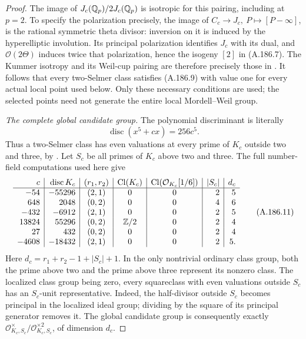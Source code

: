 \begin{proof}
The image of \(J_c(\mathbb Q_p)/2J_c(\mathbb Q_p)\) is isotropic
for this pairing, including at \(p=2\).  To specify the
polarization precisely, the image of
\(C_c\to J_c,\ P\mapsto[P-\infty]\), is the rational
symmetric theta divisor: inversion on it is induced by the
hyperelliptic involution.  Its principal polarization
identifies \(J_c\) with its dual, and \(\mathcal O(2\Theta)\)
induces twice that polarization, hence the isogeny \([2]\)
in (A.186.7).  The Kummer isotropy and its Weil-cup pairing
are therefore precisely those in
\cite[Section 4.1, Corollary 4.7, and Propositions 4.9 and 4.11,
pp.16--18]{LegPoonenRains2012}.  It follows that every
two-Selmer class satisfies (A.186.9) with value one for
every actual local point used below.  Only these necessary
conditions are used; the selected points need not generate
the entire local Mordell--Weil group.

\emph{The complete global candidate group.}
The polynomial discriminant is literally
\[
                       \operatorname{disc}(x^5+cx)=256c^5.
\tag{A.186.10}
\]
Thus a two-Selmer class has even valuations at every prime
of \(K_c\) outside two and three, by
\cite[Proposition 4.6 and Corollary 4.7, pp.252--253]{LegStollDescent2001}.
Let \(S_c\) be all primes of \(K_c\) above two and three.
The full number-field computations used here give
\[
\begin{array}{r|r|c|c|c|r|r}
c&\operatorname{disc}K_c&(r_1,r_2)&\operatorname{Cl}(K_c)
 &\operatorname{Cl}(\mathcal O_{K_c}[1/6])&|S_c|&d_c\\ \hline
-54&-55296&(2,1)&0&0&2&5\\
648&2048&(0,2)&0&0&4&6\\
-432&-6912&(2,1)&0&0&2&5\\
13824&55296&(0,2)&\mathbb Z/2&0&2&4\\
27&432&(0,2)&0&0&2&4\\
-4608&-18432&(2,1)&0&0&2&5.
\end{array}
\tag{A.186.11}
\]
Here \(d_c=r_1+r_2-1+|S_c|+1\).  In the only nontrivial
ordinary class group, both the prime above two and the
prime above three represent its nonzero class.
The localized class group being zero, every squareclass
with even valuations outside \(S_c\) has an \(S_c\)-unit
representative.  Indeed, the half-divisor outside \(S_c\)
becomes principal in the localized ideal group; dividing
by the square of its principal generator removes it.
The global candidate group is consequently exactly
\(\mathcal O_{K_c,S_c}^{\times}/
          \mathcal O_{K_c,S_c}^{\times2}\), of dimension \(d_c\).


\end{proof}
